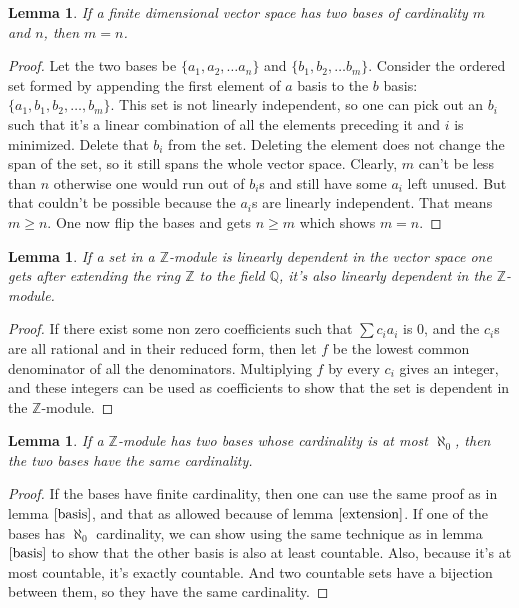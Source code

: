\documentclass[12pt, titlepage]{article}
\newtheorem{lem}[thm]{Lemma}
\theoremstyle{definition}
\begin{document}
\begin{lem}\label{basis}\cite{halmos}
If a finite dimensional vector space has two bases of cardinality $m$ and $n$, then $m=n$.
\end{lem}

\begin{proof}
Let the two bases be $\{a_1, a_2 ,\ldots a_n\}$ and $\{b_1, b_2, \ldots b_m\}$. Consider the ordered set formed by appending the first element of $a$ basis to the $b$ basis: $\{a_1, b_1, b_2, \ldots, b_m\}$. This set is not linearly independent, so one can pick out an $b_i$ such that it's a linear combination of all the elements preceding it and $i$ is minimized. Delete that $b_i$ from the set. Deleting the element does not change the span of the set, so it still spans the whole vector space. Clearly, $m$ can't be less than $n$ otherwise one would run out of $b_i$s and still have some $a_i$ left unused. But that couldn't be possible because the $a_i$s are linearly independent. That means $m \geq n$. One now flip the bases and gets $n \geq m$ which shows $m=n$.
\end{proof}

\begin{lem}\label{extension}
If a set in a $\mathbb{Z}$-module is linearly dependent in the vector space one gets after extending the ring $\mathbb{Z}$ to the field $\mathbb{Q}$, it's also linearly dependent in the $\mathbb{Z}$-module.
\end{lem}

\begin{proof}
If there exist some non zero coefficients such that $\sum c_ia_i$ is $0$, and the $c_i$s are all rational and in their reduced form, then let $f$ be the lowest common denominator of all the denominators. Multiplying $f$ by every $c_i$ gives an integer, and these integers can be used as coefficients to show that the set is dependent in the $\mathbb{Z}$-module.
\end{proof}

\begin{lem}
If a $\mathbb{Z}$-module has two bases whose cardinality is at most $\aleph_0$, then the two bases have the same cardinality.
\end{lem}

\begin{proof}
If the bases have finite cardinality, then one can use the same proof as in lemma $\autoref{basis}$, and that as allowed because of lemma $\autoref{extension}$. If one of the bases has $\aleph_0$ cardinality, we can show using the same technique as in lemma $\autoref{basis}$ to show that the other basis is also at least countable. Also, because it's at most countable, it's exactly countable. And two countable sets have a bijection between them, so they have the same cardinality.
\end{proof}
\end{document}
